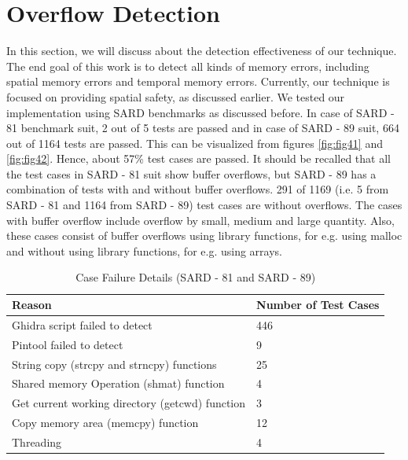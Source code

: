 \section{Overflow Detection}
In this section, we will discuss about the detection effectiveness of our technique. The end goal of this work is to detect all kinds of memory errors, including spatial memory errors and temporal memory errors. Currently, our technique is focused on providing spatial safety, as discussed earlier. We tested our implementation using SARD benchmarks as discussed before. In case of SARD - 81 benchmark suit, 2 out of 5 tests are passed and in case of SARD - 89 suit, 664 out of 1164 tests are passed. This can be visualized from figures \cref{fig:fig41} and \cref{fig:fig42}. Hence, about 57\% test cases are passed. It should be recalled that all the test cases in SARD - 81 suit show buffer overflows, but SARD - 89 has a combination of tests with and without buffer overflows. 291 of 1169 (i.e. 5 from SARD - 81 and 1164 from SARD - 89) test cases are without overflows. The cases with buffer overflow include overflow by small, medium and large quantity. Also, these cases consist of buffer overflows using library functions, for e.g. using malloc and without using library functions, for e.g. using arrays.

\begin{table}[ht]
\centering\small
\begin{tabularx}{\linewidth}{lX}
\toprule
Reason & Number of Test Cases\\
\midrule
Ghidra script failed to detect & 446\\
Pintool failed to detect & 9\\
String copy (strcpy and strncpy) functions & 25\\
Shared memory Operation (shmat) function & 4\\
Get current working directory (getcwd) function & 3\\
Copy memory area (memcpy) function  & 12\\
Threading & 4\\
\bottomrule
\end{tabularx}
\caption{Case Failure Details (SARD - 81 and SARD - 89)\label{tab:table42}}
\end{table}

